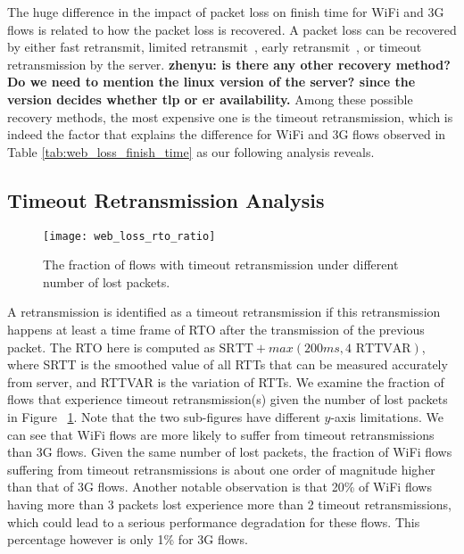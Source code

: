 The huge difference in the impact of packet loss on finish time for WiFi and 3G flows is related to how the packet loss is recovered. A packet loss can be recovered by either fast retransmit, limited retransmit~\cite{allman2001enhancing}, early retransmit~\cite{rfc5827}, or timeout retransmission by the server. \textbf{zhenyu: is there any other recovery method? Do we need to mention the linux version of the server? since the version decides whether tlp or er availability.} {\color{red}{Qinghua: As far as we know, there are the above 4 types of retransmission. Linux version could be mentioned but is not neccesary, as TLP can also be backported into old version Linux kernel. Thus we should point out that TLP is not deployed in the servers.}} Among these possible recovery methods, the most expensive one is the timeout retransmission, which is indeed the factor that explains the difference for WiFi and 3G flows observed in Table \ref{tab:web_loss_finish_time} as our following analysis reveals. 

\subsection{Timeout Retransmission Analysis}

\begin{figure}[th]
\centering
\texttt{[image: web\_loss\_rto\_ratio]}
\caption{The fraction of flows with timeout retransmission under different number of lost packets.}
\label{fig:web_loss_rto_ratio}
\end{figure}

A retransmission is identified as a timeout retransmission if this retransmission happens at least a time frame of RTO after the transmission of the previous packet. The RTO here is computed as $\text{SRTT} + max(200ms, 4 \text{ RTTVAR})$\cite{rfc62982011computing}, where SRTT is the smoothed value of all RTTs that can be measured accurately from server, and RTTVAR is the variation of RTTs. We examine the fraction of flows that experience timeout retransmission(s) given the number of lost packets in Figure ~\ref{fig:web_loss_rto_ratio}. Note that the two sub-figures have different $y$-axis limitations. We can see that WiFi flows are more likely to suffer from timeout retransmissions than 3G flows. Given the same number of lost packets, the fraction of WiFi flows suffering from timeout retransmissions is about one order of magnitude higher than that of 3G flows. Another notable observation is that 20\% of WiFi flows having more than 3 packets lost experience more than 2 timeout retransmissions, which could lead to a serious performance degradation for these flows. This percentage however is only 1\% for 3G flows. 

